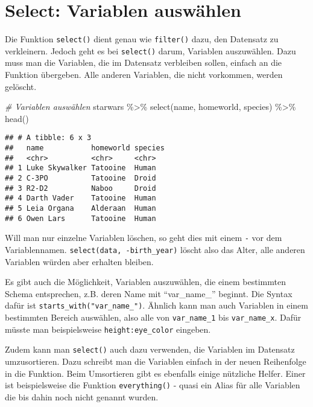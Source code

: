 \documentclass[
]{book}
\newenvironment{Shaded}{\begin{snugshade}}{\end{snugshade}}
\newcommand{\CommentTok}[1]{\textcolor[rgb]{0.56,0.35,0.01}{\textit{#1}}}
\newcommand{\FunctionTok}[1]{\textcolor[rgb]{0.00,0.00,0.00}{#1}}
\newcommand{\NormalTok}[1]{#1}
\newcommand{\SpecialCharTok}[1]{\textcolor[rgb]{0.00,0.00,0.00}{#1}}
\begin{document}
\hypertarget{select-variablen-auswuxe4hlen}{%
\section{Select: Variablen auswählen}\label{select-variablen-auswuxe4hlen}}

Die Funktion \texttt{select()} dient genau wie \texttt{filter()} dazu, den Datensatz zu verkleinern. Jedoch geht es bei \texttt{select()} darum, Variablen auszuwählen. Dazu muss man die Variablen, die im Datensatz verbleiben sollen, einfach an die Funktion übergeben. Alle anderen Variablen, die nicht vorkommen, werden gelöscht.

\begin{Shaded}
\begin{Highlighting}[]
\CommentTok{\# Variablen auswählen}
\NormalTok{starwars }\SpecialCharTok{\%\textgreater{}\%} 
  \FunctionTok{select}\NormalTok{(name, homeworld, species) }\SpecialCharTok{\%\textgreater{}\%} 
  \FunctionTok{head}\NormalTok{()}
\end{Highlighting}
\end{Shaded}

\begin{verbatim}
## # A tibble: 6 x 3
##   name           homeworld species
##   <chr>          <chr>     <chr>  
## 1 Luke Skywalker Tatooine  Human  
## 2 C-3PO          Tatooine  Droid  
## 3 R2-D2          Naboo     Droid  
## 4 Darth Vader    Tatooine  Human  
## 5 Leia Organa    Alderaan  Human  
## 6 Owen Lars      Tatooine  Human
\end{verbatim}

Will man nur einzelne Variablen löschen, so geht dies mit einem \texttt{-} vor dem Variablennamen. \texttt{select(data,\ -birth\_year)} löscht also das Alter, alle anderen Variablen würden aber erhalten bleiben.

Es gibt auch die Möglichkeit, Variablen auszuwählen, die einem bestimmten Schema entsprechen, z.B. deren Name mit ``var\_name\_'' beginnt. Die Syntax dafür ist \texttt{starts\_with("var\_name\_")}. Ähnlich kann man auch Variablen in einem bestimmten Bereich auswählen, also alle von \texttt{var\_name\_1} bis \texttt{var\_name\_x}. Dafür müsste man beispielsweise \texttt{height:eye\_color} eingeben.

Zudem kann man \texttt{select()} auch dazu verwenden, die Variablen im Datensatz umzusortieren. Dazu schreibt man die Variablen einfach in der neuen Reihenfolge in die Funktion. Beim Umsortieren gibt es ebenfalls einige nützliche Helfer. Einer ist beispielsweise die Funktion \texttt{everything()} - quasi ein Alias für alle Variablen die bis dahin noch nicht genannt wurden.
\end{document}
